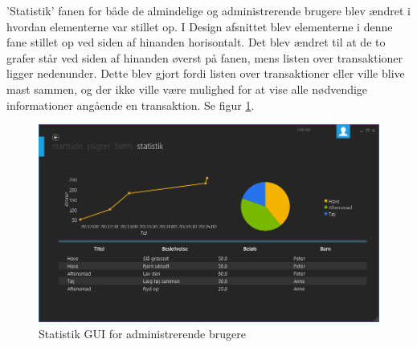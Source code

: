 ’Statistik’ fanen for både de almindelige og administrerende brugere blev ændret i hvordan elementerne var stillet op. I Design afsnittet blev elementerne i denne fane stillet op ved siden af hinanden horisontalt. Det blev ændret til at de to grafer står ved siden af hinanden øverst på fanen, mens listen over transaktioner ligger nedenunder. Dette blev gjort fordi listen over transaktioner eller ville blive mast sammen, og der ikke ville være mulighed for at vise alle nødvendige informationer angående en transaktion. Se figur \ref{AdminStatistic}.

\begin{figure}[H]
\centering
\includegraphics[width=1\textwidth]{Billeder/AdminStatisticGUI.png}
\caption{Statistik GUI for administrerende brugere}
\label{AdminStatistic}
\end{figure}